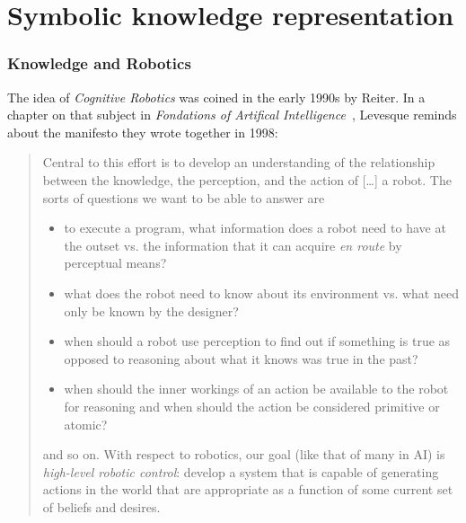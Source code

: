 \chapter{Symbolic knowledge representation}
\label{chapt|krs}


\subsection{Knowledge and Robotics}
\label{sect|knowledge}

The idea of \emph{Cognitive Robotics} was coined in the early 1990s by Reiter.
In a chapter on that subject in \emph{Fondations of Artifical
Intelligence}~\cite{Levesque2008}, Levesque reminds about the manifesto they
wrote together in 1998:

\begin{quotation}

    Central to this effort is to develop an understanding of the relationship
    between the knowledge, the perception, and the action of [\ldots] a robot. The
    sorts of questions we want to be able to answer are

    \begin{itemize} 

        \item to execute a program, what information does a robot need to have
        at the outset vs. the information that it can acquire \emph{en route}
        by perceptual means?

        \item what does the robot need to know about its environment vs. what
        need only be known by the designer?

        \item when should a robot use perception to find out if something is
        true as opposed to reasoning about what it knows was true in the past?

        \item when should the inner workings of an action be available to the
        robot for reasoning and when should the action be considered primitive
        or atomic?

    \end{itemize}

    and so on. With respect to robotics, our goal (like that of many in AI) is
    \emph{high-level robotic control}: develop a system that is capable of
    generating actions in the world that are appropriate as a function of some
    current set of beliefs and desires.

\end{quotation}


